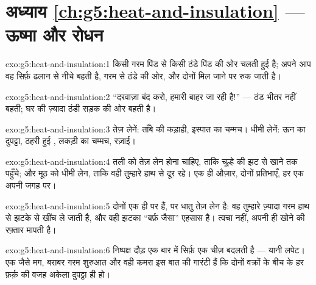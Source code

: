 \section*{अध्याय \ref{ch:g5:heat-and-insulation} --- ऊष्मा और रोधन}

\begin{solution}{exo:g5:heat-and-insulation:1}
 किसी गरम पिंड से किसी ठंडे पिंड की ओर चलती हुई  है; अपने
आप वह सिर्फ़ ढलान से नीचे बहती है, गरम से ठंडे की ओर, और दोनों 
मिल जाने पर रुक जाती है।
\end{solution}

\begin{solution}{exo:g5:heat-and-insulation:2}
``दरवाज़ा बंद करो, हमारी  बाहर जा रही है!'' --- ठंड भीतर नहीं
बहती; घर की  ज़्यादा ठंडी सड़क की ओर बहती है।
\end{solution}

\begin{solution}{exo:g5:heat-and-insulation:3}
तेज़ लेनें: ताँबे की कड़ाही, इस्पात का चम्मच। धीमी लेनें: ऊन का
दुपट्टा, ठहरी हुई , लकड़ी का चम्मच, रज़ाई।
\end{solution}

\begin{solution}{exo:g5:heat-and-insulation:4}
तली को तेज़ लेन होना चाहिए, ताकि चूल्हे की  झट से खाने तक पहुँचे;
और मूठ को धीमी लेन, ताकि वही  तुम्हारे हाथ से दूर रहे। एक ही
औज़ार, दोनों प्रतिभाएँ, हर एक अपनी जगह पर।
\end{solution}

\begin{solution}{exo:g5:heat-and-insulation:5}
दोनों एक ही  पर हैं, पर धातु तेज़ लेन है: वह तुम्हारे ज़्यादा गरम
हाथ से  झटके से खींच ले जाती है, और वही झटका ``बर्फ़ जैसा''
एहसास है। त्वचा  नहीं, अपनी ही  खोने की रफ़्तार मापती है।
\end{solution}

\begin{solution}{exo:g5:heat-and-insulation:6}
निष्पक्ष दौड़ एक बार में सिर्फ़ एक चीज़ बदलती है --- यानी लपेट। एक
जैसे मग, बराबर गरम शुरुआत और वही कमरा इस बात की गारंटी हैं कि दोनों
वक्रों के बीच के हर फ़र्क़ की वजह अकेला दुपट्टा ही हो।
\end{solution}

